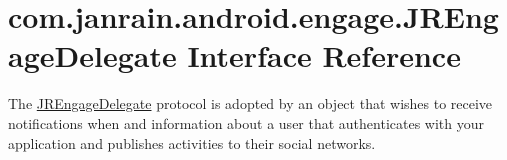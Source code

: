 \hypertarget{interfacecom_1_1janrain_1_1android_1_1engage_1_1_j_r_engage_delegate}{
\section{com.janrain.android.engage.JREngageDelegate Interface Reference}
\label{interfacecom_1_1janrain_1_1android_1_1engage_1_1_j_r_engage_delegate}
}


The \hyperlink{interfacecom_1_1janrain_1_1android_1_1engage_1_1_j_r_engage_delegate}{JREngageDelegate} protocol is adopted by an object that wishes to receive notifications when and information about a user that authenticates with your application and publishes activities to their social networks.  


